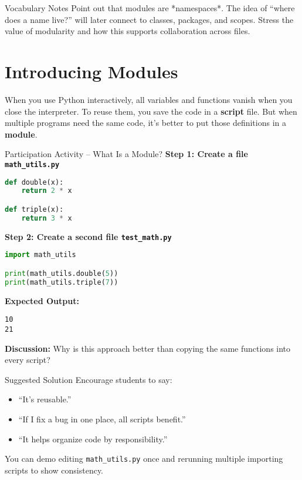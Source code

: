 \documentclass[12pt]{article}
\begin{document}
\begin{teacherbox}{Vocabulary Notes}
Point out that modules are *namespaces*.  
The idea of “where does a name live?” will later connect to classes, packages, and scopes.  
Stress the value of modularity and how this supports collaboration across files.
\end{teacherbox}

\section{Introducing Modules}

When you use Python interactively, all variables and functions vanish when you close the interpreter.  
To reuse them, you save the code in a \textbf{script} file.  
But when multiple programs need the same code, it’s better to put those definitions in a \textbf{module}.

\begin{activitybox}{Participation Activity – What Is a Module?}
\textbf{Step 1: Create a file \texttt{math\_utils.py}}
\begin{lstlisting}[language=Python]
def double(x):
    return 2 * x

def triple(x):
    return 3 * x
\end{lstlisting}

\textbf{Step 2: Create a second file \texttt{test\_math.py}}
\begin{lstlisting}[language=Python]
import math_utils

print(math_utils.double(5))
print(math_utils.triple(7))
\end{lstlisting}

\textbf{Expected Output:}
\begin{lstlisting}
10
21
\end{lstlisting}

\textbf{Discussion:}  
Why is this approach better than copying the same functions into every script?
\end{activitybox}

\begin{teacherbox}{Suggested Solution}
Encourage students to say:
\begin{itemize}
  \item “It’s reusable.”  
  \item “If I fix a bug in one place, all scripts benefit.”  
  \item “It helps organize code by responsibility.”  
\end{itemize}
You can demo editing \texttt{math\_utils.py} once and rerunning multiple importing scripts to show consistency.
\end{teacherbox}
\end{document}
